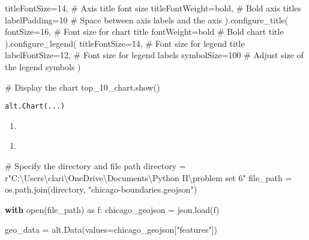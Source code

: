 \documentclass[
  letterpaper,
  DIV=11,
  numbers=noendperiod]{scrartcl}
\newenvironment{Shaded}{\begin{snugshade}}{\end{snugshade}}
\newcommand{\BuiltInTok}[1]{\textcolor[rgb]{0.00,0.23,0.31}{#1}}
\newcommand{\CommentTok}[1]{\textcolor[rgb]{0.37,0.37,0.37}{#1}}
\newcommand{\ControlFlowTok}[1]{\textcolor[rgb]{0.00,0.23,0.31}{\textbf{#1}}}
\newcommand{\DecValTok}[1]{\textcolor[rgb]{0.68,0.00,0.00}{#1}}
\newcommand{\ImportTok}[1]{\textcolor[rgb]{0.00,0.46,0.62}{#1}}
\newcommand{\NormalTok}[1]{\textcolor[rgb]{0.00,0.23,0.31}{#1}}
\newcommand{\OperatorTok}[1]{\textcolor[rgb]{0.37,0.37,0.37}{#1}}
\newcommand{\StringTok}[1]{\textcolor[rgb]{0.13,0.47,0.30}{#1}}
\newcommand{\VerbatimStringTok}[1]{\textcolor[rgb]{0.13,0.47,0.30}{#1}}
\providecommand{\tightlist}{%
  \setlength{\itemsep}{0pt}\setlength{\parskip}{0pt}}\usepackage{longtable,booktabs,array}
\begin{document}
\begin{Shaded}
\begin{Highlighting}[]
\NormalTok{    titleFontSize}\OperatorTok{=}\DecValTok{14}\NormalTok{,  }\CommentTok{\# Axis title font size}
\NormalTok{    titleFontWeight}\OperatorTok{=}\StringTok{\textquotesingle{}bold\textquotesingle{}}\NormalTok{,  }\CommentTok{\# Bold axis titles}
\NormalTok{    labelPadding}\OperatorTok{=}\DecValTok{10}  \CommentTok{\# Space between axis labels and the axis}
\NormalTok{).configure\_title(}
\NormalTok{    fontSize}\OperatorTok{=}\DecValTok{16}\NormalTok{,  }\CommentTok{\# Font size for chart title}
\NormalTok{    fontWeight}\OperatorTok{=}\StringTok{\textquotesingle{}bold\textquotesingle{}}  \CommentTok{\# Bold chart title}
\NormalTok{).configure\_legend(}
\NormalTok{    titleFontSize}\OperatorTok{=}\DecValTok{14}\NormalTok{,  }\CommentTok{\# Font size for legend title}
\NormalTok{    labelFontSize}\OperatorTok{=}\DecValTok{12}\NormalTok{,  }\CommentTok{\# Font size for legend labels}
\NormalTok{    symbolSize}\OperatorTok{=}\DecValTok{100}  \CommentTok{\# Adjust size of the legend symbols}
\NormalTok{)}

\CommentTok{\# Display the chart}
\NormalTok{top\_10\_chart.show()}
\end{Highlighting}
\end{Shaded}

\begin{verbatim}
alt.Chart(...)
\end{verbatim}

\begin{enumerate}
\def\labelenumi{\arabic{enumi}.}
\setcounter{enumi}{2}
\tightlist
\item
\end{enumerate}

\begin{enumerate}
\def\labelenumi{\alph{enumi}.}
\tightlist
\item
\end{enumerate}

\begin{Shaded}
\begin{Highlighting}[]
\CommentTok{\# Specify the directory and file path}
\NormalTok{directory }\OperatorTok{=} \VerbatimStringTok{r"C:\textbackslash{}Users\textbackslash{}clari\textbackslash{}OneDrive\textbackslash{}Documents\textbackslash{}Python II\textbackslash{}problem set 6"}
\NormalTok{file\_path }\OperatorTok{=}\NormalTok{ os.path.join(directory, }\StringTok{"chicago{-}boundaries.geojson"}\NormalTok{)}

\ControlFlowTok{with} \BuiltInTok{open}\NormalTok{(file\_path) }\ImportTok{as}\NormalTok{ f:}
\NormalTok{    chicago\_geojson }\OperatorTok{=}\NormalTok{ json.load(f)}

\NormalTok{geo\_data }\OperatorTok{=}\NormalTok{ alt.Data(values}\OperatorTok{=}\NormalTok{chicago\_geojson[}\StringTok{"features"}\NormalTok{])}
\end{Highlighting}
\end{Shaded}
\end{document}
